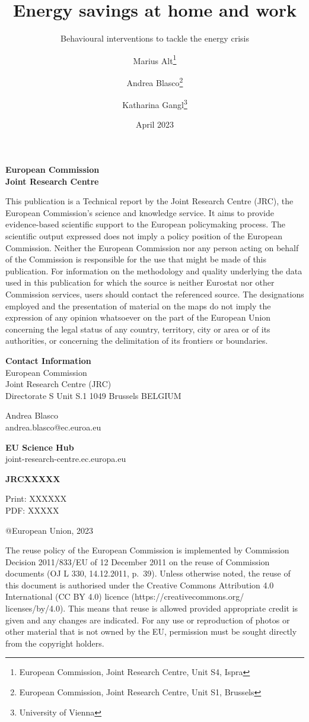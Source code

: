 \documentclass[
  11pt,
  captions=heading]{scrreport}
\title{Energy savings at home and work}
\subtitle{Behavioural interventions to tackle the energy crisis}
\author{Marius
Alt\thanks{European Commission, Joint Research Centre, Unit S4, Ispra} \and Andrea
Blasco\thanks{European Commission, Joint Research Centre, Unit S1, Brussels} \and Katharina
Gangl\thanks{University of Vienna}}
\date{April 2023}
\begin{document}
\maketitle

\newcommand{\smallnotice}{\footnotesize} 
\newcommand{\smallnoticebd}{\footnotesize\textbf}

{
\setcounter{tocdepth}{2}
\tableofcontents
}
\clearpage

\textbf{European Commission}\\
\textbf{Joint Research Centre}

\smallnotice This publication is a Technical report by the Joint
Research Centre (JRC), the European Commission's science and knowledge
service. It aims to provide evidence-based scientific support to the
European policymaking process. The scientific output expressed does not
imply a policy position of the European Commission. Neither the European
Commission nor any person acting on behalf of the Commission is
responsible for the use that might be made of this publication. For
information on the methodology and quality underlying the data used in
this publication for which the source is neither Eurostat nor other
Commission services, users should contact the referenced source. The
designations employed and the presentation of material on the maps do
not imply the expression of any opinion whatsoever on the part of the
European Union concerning the legal status of any country, territory,
city or area or of its authorities, or concerning the delimitation of
its frontiers or boundaries.

\textbf{Contact Information}\\
European Commission\\
Joint Research Centre (JRC)\\
Directorate S Unit S.1 1049 Brussels BELGIUM

Andrea Blasco\\
andrea.blasco@ec.euroa.eu

\textbf{EU Science Hub}\\
joint-research-centre.ec.europa.eu

\textbf{JRCXXXXX}

Print: XXXXXX\\
PDF: XXXXX

@European Union, 2023

\smallnotice The reuse policy of the European Commission is implemented
by Commission Decision 2011/833/EU of 12 December 2011 on the reuse of
Commission documents (OJ L 330, 14.12.2011, p.~39). Unless otherwise
noted, the reuse of this document is authorised under the Creative
Commons Attribution 4.0 International (CC BY 4.0) licence
(https://creativecommons.org/ licenses/by/4.0). This means that reuse is
allowed provided appropriate credit is given and any changes are
indicated. For any use or reproduction of photos or other material that
is not owned by the EU, permission must be sought directly from the
copyright holders.
\end{document}
